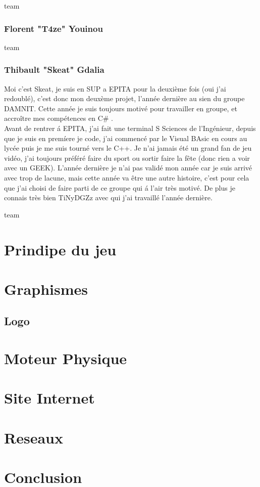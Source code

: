 \documentclass [11pt]{report}
\begin{document}
		\vfill
		team
		\newpage
		\subsection {Florent "T4ze" Youinou}
	
		\vfill
		team
		\newpage
		\subsection {Thibault "Skeat" Gdalia}
			Moi c'est Skeat, je suis en SUP a EPITA pour la deuxi\`eme fois (oui j'ai redoubl\'e),  c'est donc mon deux\`eme projet, l'ann\'ee derni\`ere au sien du groupe DAMNIT. Cette ann\'ee je suis toujours motiv\'e pour travailler en groupe, et accro\^itre mes comp\'etences en C\# . 
			\\  Avant de rentrer \'a EPITA, j'ai fait une terminal S Sciences de l'Ing\'enieur, depuis que je suis en prem\'iere je code, j'ai commenc\'e par le Visual BAsic en cours au lyc\'ee puis je me suis tourn\'e vers le C++. Je n'ai jamais \'et\'e un grand fan de jeu vid\'eo, j'ai toujours pr\'ef\'er\'e faire du sport ou sortir faire la f\^ete (donc rien a voir avec un GEEK). L'ann\'ee derni\`ere je n'ai pas valid\'e mon ann\'ee car je suis arriv\'e avec trop de lacune, mais cette ann\'ee va \^etre une autre histoire, c'est pour cela que j'ai choisi de faire parti de ce groupe qui \'a l'air tr\`es motiv\'e. De plus je connais tr\`es bien TiNyDGZz avec qui j'ai travaill\'e l'ann\'ee derni\`ere.
	
	\vfill
	team
	\newpage\
\chapter{Prindipe du jeu}

\chapter {Graphismes}
	\section {Logo}
\chapter {Moteur Physique}
\chapter {Site Internet}
\chapter {Reseaux}
\chapter {Conclusion}
\end{document}
